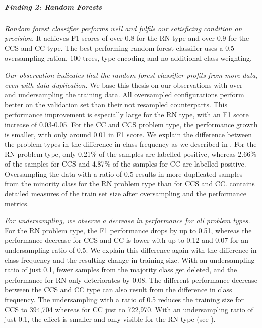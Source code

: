 \subparagraph{Finding 2: Random Forests}
\textit{Random forest classifier performs well and fulfils our satisficing condition on precision.} It achieves F1 scores of over 0.8 for the RN type and over 0.9 for the CCS and CC type.
The best performing random forest classifier uses a 0.5 oversampling ration, 100 trees, type encoding and no additional class weighting.


\textit{Our observation indicates that the random forest classifier profits from more data, even with data duplication.} We base this thesis on our observations with over- and undersampling the training data. 
All oversampled configurations perform better on the validation set than their not resampled counterparts. This performance improvement is especially large for the RN type, with an F1 score increase of 0.03-0.05. For the CC and CCS problem type, the performance growth is smaller, with only around 0.01 in F1 score. We explain the difference between the problem types in the difference in class frequency as we described in . For the RN problem type, only 0.21\% of the samples are labelled positive, whereas 2.66\% of the samples for CCS and 4.87\% of the samples for CC are labelled positive. Oversampling the data with a ratio of 0.5 results in more duplicated samples from the minority class for the RN problem type than for CCS and CC.  contains detailed measures of the train set size after oversampling and the performance metrics.

\textit{For undersampling, we observe a decrease in performance for all problem types.} For the RN problem type, the F1 performance drops by up to 0.51, whereas the performance decrease for CCS and CC is lower with up to 0.12 and 0.07 for an undersampling ratio of 0.5. We explain this difference again with the difference in class frequency and the resulting change in training size. With an undersampling ratio of just 0.1, fewer samples from the majority class get deleted, and the performance for RN only deteriorates by 0.08.
The different performance decrease between the CCS and CC type can also result from the difference in class frequency. The undersampling with a ratio of 0.5 reduces the training size for CCS to 394,704 whereas for CC just to 722,970. With an undersampling ratio of just 0.1, the effect is smaller and only visible for the RN type (see ).


